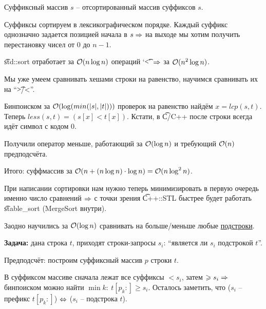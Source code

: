 
\begin{Def}
Суффиксный массив $s$ -- отсортированный массив суффиксов $s$.
\end{Def}

Суффиксы сортируем в лексикографическом порядке.
Каждый суффикс однозначно задается позицией начала в $s \Rightarrow$ 
на выходе мы хотим получить перестановку чисел от $0$ до $n{-}1$.

 \t{std::sort} отработает за $\mathcal{O}(n \log n)$ операций `\t{<}' $\Rightarrow$ за $\mathcal{O}(n^2 \log n)$.

\up
{}

Мы уже умеем сравнивать хешами строки на равенство, научимся сравнивать их на ``\t{>/<}''.

Бинпоиском за $\mathcal{O}(\log(min(|s|, |t|)))$ проверок на равенство найдём $x = lcp(s,t)$.\\
Теперь $less(s, t) = (s[x] < t[x])$. Кстати, в \t{C/C++} после строки всегда идёт символ с кодом $0$.

\down
Получили оператор меньше, работающий за $\mathcal{O}(\log n)$ и требующий $\mathcal{O}(n)$ предподсчёта.

Итого: суффмассив за $\mathcal{O}(n + (n \log n) \cdot \log n) = \mathcal{O}(n \log^2 n)$.

\down
При написании сортировки нам нужно теперь минимизировать в первую очередь именно число сравнений $\Rightarrow$
с точки зрения \t{C++::STL} быстрее будет работать \t{stable\_sort} (MergeSort внутри).

\begin{Rem}
Заодно научились за $\mathcal{O}(\log n)$ сравнивать на больше/меньше любые \underline{подстроки}.
\end{Rem}

\up
{}

{\bf Задача:} дана строка $t$, приходят строки-запросы $s_i$: ``является ли $s_i$ подстрокой $t$''.

\down
Предподсчёт: построим суффиксный массив $p$ строки $t$. 

В суффиксом массиве сначала лежат все суффиксы $< s_i$, затем $\geqslant s_i \Rightarrow$
бинпоиском можно найти $\min k \colon\ t[p_k{:}] \ge s_i$. 
Осталось заметить, что ($s_i$ -- префикс $t[p_k{:}]$) $\Leftrightarrow$ ($s_i$ -- подстрока $t$).

